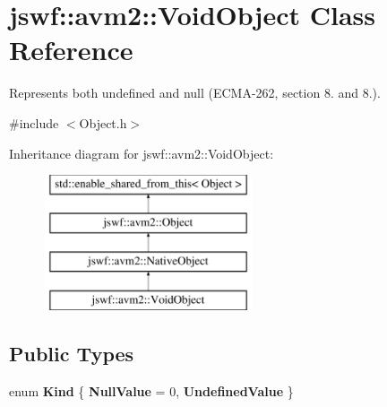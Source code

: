 \hypertarget{classjswf_1_1avm2_1_1_void_object}{\section{jswf\+:\+:avm2\+:\+:Void\+Object Class Reference}
\label{classjswf_1_1avm2_1_1_void_object}
}


Represents both {\ttfamily undefined} and {\ttfamily null} (E\+C\+M\+A-\/262, section 8. and 8.).  




{\ttfamily \#include $<$Object.\+h$>$}

Inheritance diagram for jswf\+:\+:avm2\+:\+:Void\+Object\+:\begin{figure}[H]
\begin{center}
\leavevmode
\includegraphics[height=4.000000cm]{classjswf_1_1avm2_1_1_void_object}
\end{center}
\end{figure}
\subsection*{Public Types}
\begin{DoxyCompactItemize}
\item 
\hypertarget{classjswf_1_1avm2_1_1_void_object_a221ab4b4f3b691e843ff79bd29e4f24d}{enum {\bfseries Kind} \{ {\bfseries Null\+Value} = 0, 
{\bfseries Undefined\+Value}
 \}}\label{classjswf_1_1avm2_1_1_void_object_a221ab4b4f3b691e843ff79bd29e4f24d}

\end{DoxyCompactItemize}
